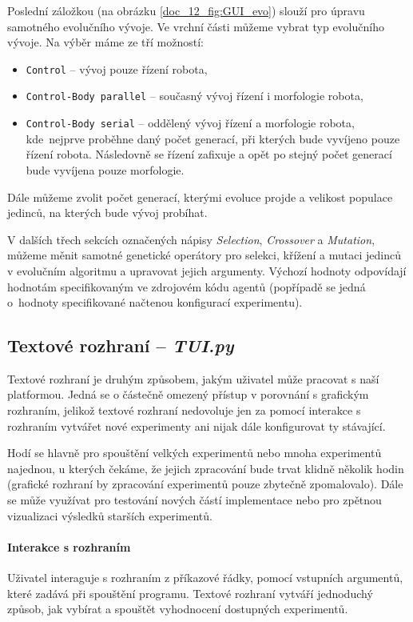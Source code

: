 Poslední záložkou (na obrázku \ref{doc_12_fig:GUI_evo}) slouží pro úpravu
samotného evolučního vývoje. Ve vrchní části můžeme vybrat typ evolučního
vývoje. Na výběr máme ze tří možností: 
\begin{itemize}
    \item \texttt{Control} -- vývoj pouze řízení robota,
    \item \texttt{Control-Body parallel} -- současný vývoj řízení i morfologie
        robota,
    \item \texttt{Control-Body serial} -- oddělený vývoj řízení a morfologie
        robota, kde~nejprve proběhne daný počet generací, při kterých bude
        vyvíjeno pouze řízení robota. Následovně se řízení zafixuje a opět po
        stejný počet generací bude vyvíjena pouze morfologie.
\end{itemize}

Dále můžeme zvolit počet generací, kterými evoluce projde a velikost populace
jedinců, na kterých bude vývoj probíhat.

V dalších třech sekcích označených nápisy \emph{Selection}, \emph{Crossover} a
\emph{Mutation}, můžeme měnit samotné genetické operátory pro selekci, křížení
a mutaci jedinců v evolučním algoritmu a upravovat jejich argumenty. Výchozí
hodnoty odpovídají hodnotám specifikovaným ve zdrojovém kódu agentů (popřípadě
se jedná o~hodnoty specifikované načtenou konfigurací experimentu).

\subsection{Textové rozhraní -- \emph{TUI.py}} \label{doc_13_TUI}
Textové rozhraní je druhým způsobem, jakým uživatel může pracovat s naší
platformou. Jedná se o částečně omezený přístup v porovnání s grafickým
rozhraním, jelikož textové rozhraní nedovoluje jen za pomocí interakce s
rozhraním vytvářet nové experimenty ani nijak dále konfigurovat ty stávající.

Hodí se hlavně pro spouštění velkých experimentů nebo mnoha experimentů
najednou, u kterých čekáme, že jejich zpracování bude trvat klidně několik
hodin (grafické rozhraní by zpracování experimentů pouze zbytečně zpomalovalo).
Dále se může využívat pro testování nových částí implementace nebo pro zpětnou
vizualizaci výsledků starších experimentů.

\paragraph{Interakce s rozhraním}
Uživatel interaguje s rozhraním z příkazové řádky, pomocí vstupních argumentů,
které zadává při spouštění programu. Textové rozhraní vytváří jednoduchý
způsob, jak vybírat a spouštět vyhodnocení dostupných experimentů.

